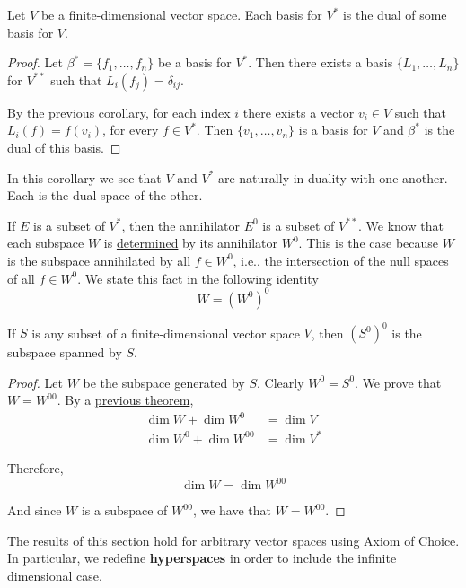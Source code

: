 \begin{corollary}
	Let $V$ be a finite-dimensional vector space. Each basis for $V^\ast$ is the dual of some basis for $V$.
\end{corollary}

\begin{proof}
	Let $\beta^\ast = \{ f_1, \ldots, f_n \}$ be a basis for $V^\ast$. Then there exists a basis $\{ L_1, \ldots, L_n \}$ for $V^{\ast \ast}$ such that $L_i(f_j) = \delta_{ij}$.

	By the previous corollary, for each index $i$ there exists a vector $v_i \in V$ such that $L_i(f) = f(v_i)$, for every $f \in V^\ast$. Then $\{ v_1, \ldots, v_n \}$ is a basis for $V$ and $\beta^\ast$ is the dual of this basis.
\end{proof}

In this corollary we see that $V$ and $V^\ast$ are naturally in duality with one another. Each is the dual space of the other.

If $E$ is a subset of $V^\ast$, then the annihilator $E^0$ is a subset of $V^{\ast \ast}$. We know that each subspace $W$ is \hyperref[cor:determined-annihilator]{determined} by its annihilator $W^0$. This is the case because $W$ is the subspace annihilated by all $f \in W^0$, i.e., the intersection of the null spaces of all $f \in W^0$. We state this fact in the following identity
\[
	W = (W^0)^0
\]

\begin{theorem}
	If $S$ is any subset of a finite-dimensional vector space $V$, then $(S^0)^0$ is the subspace spanned by $S$.
\end{theorem}

\begin{proof}
	Let $W$ be the subspace generated by $S$. Clearly $W^0 = S^0$. We prove that $W = W^{00}$. By a \hyperref[thm:dim-annihilator]{previous theorem},
	\begin{equation*}
		\begin{aligned}
			\dim W + \dim W^0 &= \dim V \\
			\dim W^0 + \dim W^{00} &= \dim V^\ast
		\end{aligned}
	\end{equation*}
	
	Therefore, 
	\[
		\dim W = \dim W^{00}
	\]

	And since $W$ is a subspace of $W^{00}$, we have that $W = W^{00}$.
\end{proof}

The results of this section hold for arbitrary vector spaces using Axiom of Choice. In particular, we redefine \textbf{hyperspaces} in order to include the infinite dimensional case.

